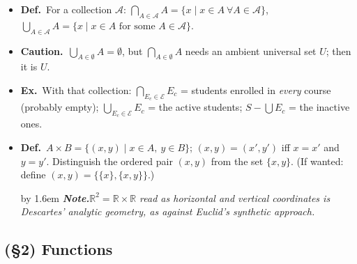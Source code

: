 \documentclass[12pt,a4paper]{article}
\newcommand{\Dfn}{\textbf{Def.}~}
\newcommand{\Exa}{\textbf{Ex.}~}
\newcommand{\Warn}{\textbf{Caution.}~}
\newcommand{\Cue}[1]{%
  \par\addvspace{7pt}\nopagebreak
  \begingroup
    \advance\leftskip by 1.6em
    \parindent=0pt \small\color{cue}%
    \textbf{\textit{Note.}}\enspace \textit{#1}\par
  \endgroup
  \addvspace{9pt}}
\newenvironment{BL}%
  {\begin{itemize}[leftmargin=1.4em,labelsep=0.55em,itemsep=11pt,topsep=11pt,parsep=0pt]}%
  {\end{itemize}}
\newcommand{\RR}{\mathbb{R}}
\newcommand{\cA}{\mathcal{A}}
\begin{document}
\begin{BL}
\Cue{Note $E_c=E_d$ can happen for $c\neq d$ (both empty). Worth pointing out before indexed
families in \S5, where exactly this failure of injectivity is allowed.}
\item \Dfn For a collection $\cA$:
      \(\bigcap_{A\in\cA}A=\{x\mid x\in A\ \forall A\in\cA\}\),\quad
      \(\bigcup_{A\in\cA}A=\{x\mid x\in A\text{ for some }A\in\cA\}\).
\item \Warn $\bigcup_{A\in\emptyset}A=\emptyset$, but $\bigcap_{A\in\emptyset}A$ needs an
      ambient universal set $U$; then it is $U$.
\item \Exa With that collection: $\bigcap_{E_c\in\mathscr{E}}E_c$ = students enrolled in
      \emph{every} course (probably empty); $\bigcup_{E_c\in\mathscr{E}}E_c$ = the active
      students; $S-\bigcup E_c$ = the inactive ones.
\item \Dfn $A\times B=\{(x,y)\mid x\in A,\ y\in B\}$;\quad
      $(x,y)=(x',y')$ iff $x=x'$ and $y=y'$.
      Distinguish the ordered pair $(x,y)$ from the set $\{x,y\}$.
      (If wanted: define $(x,y)=\{\{x\},\{x,y\}\}$.)
\Cue{$\RR^2=\RR\times\RR$ read as horizontal and vertical coordinates is Descartes' analytic
geometry, as against Euclid's synthetic approach.}
\end{BL}

\subsection{(\S2) Functions}
\end{document}

